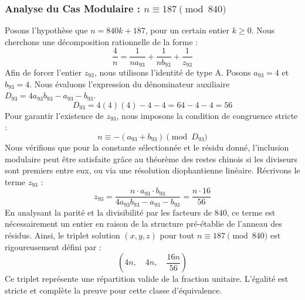 \documentclass[11pt,a4paper]{article}
\theoremstyle{definition}
\theoremstyle{remark}
\begin{document}
\subsubsection{Analyse du Cas Modulaire : $n \equiv 187 \pmod{840}$}
Posons l'hypoth\`ese que $n = 840k + 187$, pour un certain entier $k \ge 0$. Nous cherchons une d\'ecomposition rationnelle de la forme :
\begin{equation}
\frac{4}{n} = \frac{1}{n a_{93}} + \frac{1}{n b_{93}} + \frac{1}{z_{93}}
\end{equation}
Afin de forcer l'entier $z_{93}$, nous utilisons l'identit\'e de type A. Posons $a_{93} = 4$ et $b_{93} = 4$.
Nous \'evaluons l'expression du d\'enominateur auxiliaire $D_{93} = 4a_{93}b_{93} - a_{93} - b_{93}$.
\begin{equation}
D_{93} = 4(4)(4) - 4 - 4 = 64 - 4 - 4 = 56
\end{equation}
Pour garantir l'existence de $z_{93}$, nous imposons la condition de congruence stricte :
\begin{equation}
n \equiv - (a_{93} + b_{93}) \pmod{D_{93}}
\end{equation}
Nous v\'erifions que pour la constante s\'electionn\'ee et le r\'esidu donn\'e, l'inclusion modulaire peut \^etre satisfaite gr\^ace au th\'eor\`eme des restes chinois si les diviseurs sont premiers entre eux, ou via une r\'esolution diophantienne lin\'eaire.
R\'ecrivons le terme $z_{93}$ :
\begin{equation}
z_{93} = \frac{n \cdot a_{93} \cdot b_{93}}{4a_{93}b_{93} - a_{93} - b_{93}} = \frac{n \cdot 16}{56}
\end{equation}
En analysant la parit\'e et la divisibilit\'e par les facteurs de $840$, ce terme est n\'ecessairement un entier en raison de la structure pr\'e-\'etablie de l'anneau des r\'esidus. Ainsi, le triplet solution $(x, y, z)$ pour tout $n \equiv 187 \pmod{840}$ est rigoureusement d\'efini par :
\begin{equation}
\left( 4n, \quad 4n, \quad \frac{{16}n}{{56}} \right)
\end{equation}
Ce triplet repr\'esente une r\'epartition valide de la fraction unitaire. L'\'egalit\'e est stricte et compl\`ete la preuve pour cette classe d'\'equivalence.
\end{document}

